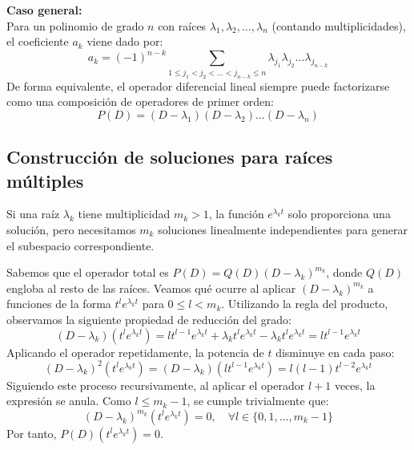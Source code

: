 \textbf{Caso general:}\\
Para un polinomio de grado $n$ con raíces $\lambda_1, \lambda_2, \dots, \lambda_n$ (contando multiplicidades), el coeficiente $a_k$ viene dado por:
\[
    a_k = (-1)^{n-k} \sum_{1 \leq j_1 < j_2 < \dots < j_{n-k} \leq n} \lambda_{j_1} \lambda_{j_2} \dots \lambda_{j_{n-k}}
\]
De forma equivalente, el operador diferencial lineal siempre puede factorizarse como una composición de operadores de primer orden:
\[
    P(D) = (D - \lambda_1)(D - \lambda_2) \dots (D - \lambda_n)
\]

\subsection{Construcción de soluciones para raíces múltiples}

Si una raíz $\lambda_k$ tiene multiplicidad $m_k > 1$, la función $e^{\lambda_k t}$ solo proporciona una solución, pero necesitamos $m_k$ soluciones linealmente independientes para generar el subespacio correspondiente.

Sabemos que el operador total es $P(D) = Q(D)(D - \lambda_k)^{m_k}$, donde $Q(D)$ engloba al resto de las raíces. Veamos qué ocurre al aplicar $(D - \lambda_k)^{m_k}$ a funciones de la forma $t^l e^{\lambda_k t}$ para $0 \leq l < m_k$.
Utilizando la regla del producto, observamos la siguiente propiedad de reducción del grado:
\[
    (D - \lambda_k)(t^l e^{\lambda_k t}) = l t^{l-1} e^{\lambda_k t} + \lambda_k t^l e^{\lambda_k t} - \lambda_k t^l e^{\lambda_k t} = l t^{l-1} e^{\lambda_k t}
\]
Aplicando el operador repetidamente, la potencia de $t$ disminuye en cada paso:
\[
    (D - \lambda_k)^2 (t^l e^{\lambda_k t}) = (D - \lambda_k) (l t^{l-1} e^{\lambda_k t}) = l(l-1) t^{l-2} e^{\lambda_k t}
\]
Siguiendo este proceso recursivamente, al aplicar el operador $l+1$ veces, la expresión se anula. Como $l \leq m_k - 1$, se cumple trivialmente que:
\[
    (D - \lambda_k)^{m_k} (t^l e^{\lambda_k t}) = 0, \quad \forall l \in \{0, 1, \dots, m_k - 1\}
\]
Por tanto, $P(D) (t^l e^{\lambda_k t}) = 0$. 


